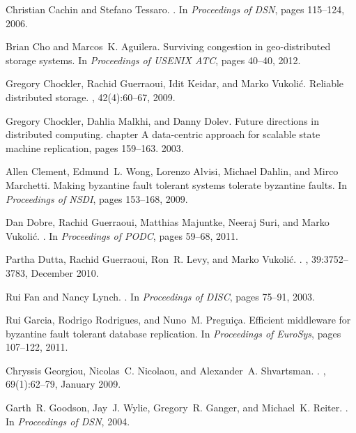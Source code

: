 \documentclass[10pt,conference,compsocconf]{IEEEtran}
\begin{document}
\begin{thebibliography}{10}
Christian Cachin and Stefano Tessaro.
.
\newblock In {\em Proceedings of DSN}, pages 115--124, 2006.

Brian Cho and Marcos~K. Aguilera.
\newblock Surviving congestion in geo-distributed storage systems.
\newblock In {\em Proceedings of USENIX ATC}, pages 40--40, 2012.

Gregory Chockler, Rachid Guerraoui, Idit Keidar, and Marko Vukoli\'c.
\newblock Reliable distributed storage.
, 42(4):60--67, 2009.

Gregory Chockler, Dahlia Malkhi, and Danny Dolev.
\newblock Future directions in distributed computing.
\newblock chapter A data-centric approach for scalable state machine
  replication, pages 159--163. 2003.

Allen Clement, Edmund~L. Wong, Lorenzo Alvisi, Michael Dahlin, and Mirco
  Marchetti.
\newblock Making byzantine fault tolerant systems tolerate byzantine faults.
\newblock In {\em Proceedings of NSDI}, pages 153--168, 2009.

Dan Dobre, Rachid Guerraoui, Matthias Majuntke, Neeraj Suri, and Marko
  Vukoli\'{c}.
.
\newblock In {\em Proceedings of PODC}, pages 59--68, 2011.

Partha Dutta, Rachid Guerraoui, Ron~R. Levy, and Marko Vukoli\'{c}.
.
, 39:3752--3783, December 2010.

Rui Fan and Nancy Lynch.
.
\newblock In {\em Proceedings of DISC}, pages 75--91, 2003.

Rui Garcia, Rodrigo Rodrigues, and Nuno~M. Pregui\c{c}a.
\newblock Efficient middleware for byzantine fault tolerant database
  replication.
\newblock In {\em Proceedings of EuroSys}, pages 107--122, 2011.

Chryssis Georgiou, Nicolas~C. Nicolaou, and Alexander~A. Shvartsman.
.
, 69(1):62--79, January 2009.

Garth~R. Goodson, Jay~J. Wylie, Gregory~R. Ganger, and Michael~K. Reiter.
.
\newblock In {\em Proceedings of DSN}, 2004.


\end{thebibliography}
\end{document}
